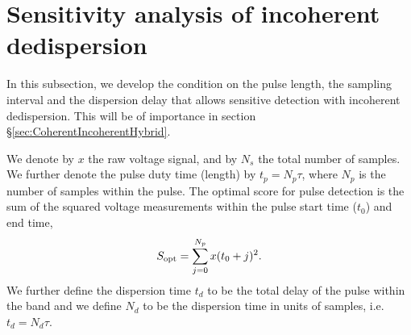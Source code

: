\documentclass[iop]{emulateapj}
\begin{document}
\section{Sensitivity analysis of incoherent dedispersion} \label{sec:SensitivityIncoherentDedispersion}

In this subsection, we develop the condition on the pulse length, the sampling interval and the dispersion delay that allows sensitive detection with incoherent dedispersion. This will be of importance in section \S\ref{sec:CoherentIncoherentHybrid}.  %

We denote by $x$ the raw voltage signal, and by $N_s$ the total number of samples. 
We further denote the pulse duty time (length) by $t_p  =  N_p\tau$, where $N_p$ is the number of samples within the pulse.
The optimal score for pulse detection is the sum of the squared voltage measurements within the pulse start time ($t_0$) and end time, 
\begin{equation}
S_{\rm opt} = \sum_{j=0}^{N_p}{x(t_0+j)^2}.
\end{equation}
We further define the dispersion time $t_d$ to be the total delay of the pulse within the band and we define $N_d$ to be the dispersion time in units of samples, i.e. $t_d =N_d\tau$.
\end{document}

